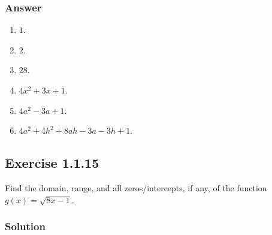 \documentclass[11pt, letterpaper, oneside]{memoir}
\begin{document}
\subsubsection{Answer}

\begin{enumerate}[label=(\alph*)]
  \item $ 1 $.
  \item $ 2 $.
  \item $ 28 $.
  \item $ 4x^2 + 3x + 1 $.
  \item $ 4a^2 - 3a + 1 $.
  \item $ 4a^2 + 4h^2 + 8ah -3a - 3h + 1 $.
\end{enumerate}

\subsection*{Exercise 1.1.15}

Find the domain, range, and all zeros/intercepts, if any, of the function $ g(x) = \sqrt{8x - 1} $.

\subsubsection{Solution}
\end{document}
